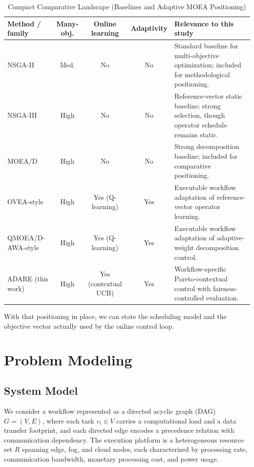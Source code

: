 \documentclass[runningheads]{llncs}
\begin{document}
\begin{table}[t]
\caption{Compact Comparative Landscape (Baselines and Adaptive MOEA Positioning)}
\label{tab:baseline_landscape}
\centering
\scriptsize
\begin{tabularx}{\textwidth}{@{}l c c c >{\raggedright\arraybackslash}X@{}}
\toprule
Method / family & Many-obj. & Online learning & Adaptivity & Relevance to this study \\
\midrule
NSGA-II \cite{deb2002nsga2} & Med. & No & No & Standard baseline for multi-objective optimization; included for methodological positioning. \\
NSGA-III \cite{deb2014nsga3} & High & No & No & Reference-vector static baseline; strong selection, though operator schedule remains static. \\
MOEA/D \cite{zhang2007moead} & High & No & No & Strong decomposition baseline; included for comparative positioning. \\
OVEA-style \cite{jiao2023ovea} & High & Yes (Q-learning) & Yes & Executable workflow adaptation of reference-vector operator learning. \\
QMOEA/D-AWA-style \cite{wang2026qmoeadawa} & High & Yes (Q-learning) & Yes & Executable workflow adaptation of adaptive-weight decomposition control. \\
ADARE (this work) & High & Yes (contextual UCB) & Yes & Workflow-specific Pareto-contextual control with fairness-controlled evaluation. \\
\bottomrule
\end{tabularx}
\end{table}

With that positioning in place, we can state the scheduling model and the objective vector actually used by the online control loop.

\section{Problem Modeling}
\subsection{System Model}
We consider a workflow represented as a directed acyclic graph (DAG) $G=(V,E)$, where each task $v_i \in V$ carries a computational load and a data transfer footprint, and each directed edge encodes a precedence relation with communication dependency. The execution platform is a heterogeneous resource set $R$ spanning edge, fog, and cloud nodes, each characterized by processing rate, communication bandwidth, monetary processing cost, and power usage.
\end{document}

